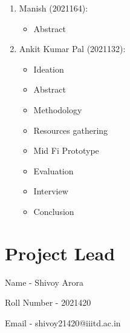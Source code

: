 \documentclass[acmtog]{acmart}
\begin{document}
\begin{enumerate}
    \item Manish (2021164):
    \begin{itemize}
        \item Abstract
    \end{itemize}

    \item Ankit Kumar Pal (2021132):
    \begin{itemize}
        \item Ideation
        \item Abstract
        \item Methodology
        \item Resources gathering
        \item Mid Fi Prototype
        \item Evaluation
        \item Interview
        \item Conclusion
    \end{itemize}
\end{enumerate}


\section*{Project Lead}

\noindent Name - Shivoy Arora

\noindent Roll Number - 2021420

\noindent Email - shivoy21420@iiitd.ac.in
\end{document}
